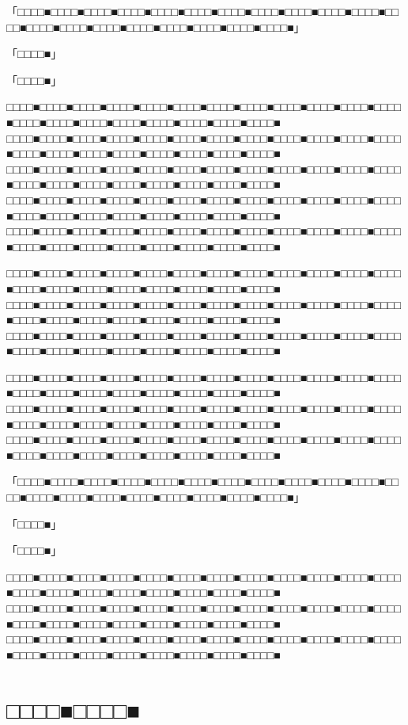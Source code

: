 \documentclass[
tate,
book,
openany,
paper={202mm,270mm},
oneside,
fontsize=9pt, %
jafontsize=9pt, %
head_space=11truemm, %
gutter=8truemm, %
line_length=78zw, %
number_of_lines=35, %
column_gap=5truemm,%
headfoot_verticalposition=4truemm,%
draft
]{jlreq}
\begin{document}
\begin{multicols*}{3}
「□□□□■□□□□■□□□□■□□□□■□□□□■□□□□■□□□□■□□□□■□□□□■□□□□■□□□□■□□□□■□□□□■□□□□■□□□□■□□□□■□□□□■□□□□■□□□□■□□□□■」

「□□□□■」

「□□□□■」

□□□□■□□□□■□□□□■□□□□■□□□□■□□□□■□□□□■□□□□■□□□□■□□□□■□□□□■□□□□■□□□□■□□□□■□□□□■□□□□■□□□□■□□□□■□□□□■□□□□■
□□□□■□□□□■□□□□■□□□□■□□□□■□□□□■□□□□■□□□□■□□□□■□□□□■□□□□■□□□□■□□□□■□□□□■□□□□■□□□□■□□□□■□□□□■□□□□■□□□□■
□□□□■□□□□■□□□□■□□□□■□□□□■□□□□■□□□□■□□□□■□□□□■□□□□■□□□□■□□□□■□□□□■□□□□■□□□□■□□□□■□□□□■□□□□■□□□□■□□□□■
□□□□■□□□□■□□□□■□□□□■□□□□■□□□□■□□□□■□□□□■□□□□■□□□□■□□□□■□□□□■□□□□■□□□□■□□□□■□□□□■□□□□■□□□□■□□□□■□□□□■
□□□□■□□□□■□□□□■□□□□■□□□□■□□□□■□□□□■□□□□■□□□□■□□□□■□□□□■□□□□■□□□□■□□□□■□□□□■□□□□■□□□□■□□□□■□□□□■□□□□■

□□□□■□□□□■□□□□■□□□□■□□□□■□□□□■□□□□■□□□□■□□□□■□□□□■□□□□■□□□□■□□□□■□□□□■□□□□■□□□□■□□□□■□□□□■□□□□■□□□□■
□□□□■□□□□■□□□□■□□□□■□□□□■□□□□■□□□□■□□□□■□□□□■□□□□■□□□□■□□□□■□□□□■□□□□■□□□□■□□□□■□□□□■□□□□■□□□□■□□□□■
□□□□■□□□□■□□□□■□□□□■□□□□■□□□□■□□□□■□□□□■□□□□■□□□□■□□□□■□□□□■□□□□■□□□□■□□□□■□□□□■□□□□■□□□□■□□□□■□□□□■

□□□□■□□□□■□□□□■□□□□■□□□□■□□□□■□□□□■□□□□■□□□□■□□□□■□□□□■□□□□■□□□□■□□□□■□□□□■□□□□■□□□□■□□□□■□□□□■□□□□■
□□□□■□□□□■□□□□■□□□□■□□□□■□□□□■□□□□■□□□□■□□□□■□□□□■□□□□■□□□□■□□□□■□□□□■□□□□■□□□□■□□□□■□□□□■□□□□■□□□□■
□□□□■□□□□■□□□□■□□□□■□□□□■□□□□■□□□□■□□□□■□□□□■□□□□■□□□□■□□□□■□□□□■□□□□■□□□□■□□□□■□□□□■□□□□■□□□□■□□□□■

「□□□□■□□□□■□□□□■□□□□■□□□□■□□□□■□□□□■□□□□■□□□□■□□□□■□□□□■□□□□■□□□□■□□□□■□□□□■□□□□■□□□□■□□□□■□□□□■□□□□■」

「□□□□■」

「□□□□■」

□□□□■□□□□■□□□□■□□□□■□□□□■□□□□■□□□□■□□□□■□□□□■□□□□■□□□□■□□□□■□□□□■□□□□■□□□□■□□□□■□□□□■□□□□■□□□□■□□□□■
□□□□■□□□□■□□□□■□□□□■□□□□■□□□□■□□□□■□□□□■□□□□■□□□□■□□□□■□□□□■□□□□■□□□□■□□□□■□□□□■□□□□■□□□□■□□□□■□□□□■
□□□□■□□□□■□□□□■□□□□■□□□□■□□□□■□□□□■□□□□■□□□□■□□□□■□□□□■□□□□■□□□□■□□□□■□□□□■□□□□■□□□□■□□□□■□□□□■□□□□■


\end{multicols*}


\part{□□□□■□□□□■}
\end{document}
